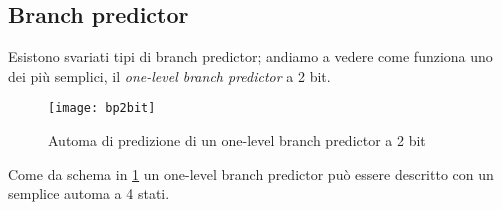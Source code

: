 		\subsection{Branch predictor}
			Esistono svariati tipi di branch predictor; andiamo a vedere come funziona uno dei più semplici, il \emph{one-level branch predictor} a 2 bit.
			
			\begin{figure}
				\begin{center}
					\texttt{[image: bp2bit]}
					\caption{Automa di predizione di un one-level branch predictor a 2 bit}
					\label{fig:bp2bits}
				\end{center}
			\end{figure}
		
			Come da schema in \cref{fig:bp2bits} un one-level branch predictor può essere descritto con un semplice automa a 4 stati.